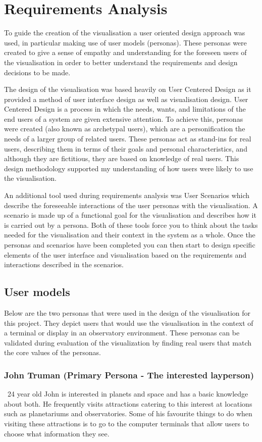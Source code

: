 \chapter{Requirements Analysis}\label{C:ra}
To guide the creation of the visualisation a user oriented design approach was
used, in particular making use of user models (personas). These personas were
created to give a sense of empathy and understanding for the foreseen users of
the visualisation in order to better understand the requirements and design
decisions to be made. 

The design of the visualisation was based heavily on User Centered Design as it
provided a method of user interface design as well as visualisation design. User
Centered Design is a process in which the needs, wants, and limitations of the
end users of a system are given extensive attention. To achieve this, personas
were created (also known as archetypal users), which are a personification the
needs of a larger group of related users. These personas act as stand-ins for
real users, describing them in terms of their goals and personal
characteristics, and although they are fictitious, they are based on knowledge
of real users. This design methodology supported my understanding of how users
were likely to use the visualisation.

An additional tool used during requirements analysis was User Scenarios which
describe the foreseeable interactions of the user personas with the
visualisation. A scenario is made up of a functional goal for the visualisation
and describes how it is carried out by a persona. Both of these tools force you
to think about the tasks needed for the visualisation and their context in the
system as a whole. Once the personas and scenarios have been completed you can
then start to design specific elements of the user interface and visualisation
based on the requirements and interactions described in the scenarios.
\section{User models}
Below are the two personas that were used in the design of the visualisation for
this project. They depict users that would use the visualisation in the context
of a terminal or display in an observatory environment. These personas  can be
validated during evaluation of the visualization by finding real users that
match the core values of the personas.

\subsection{John Truman (Primary Persona - The interested layperson)}\
24 year old John is interested in planets and space and has a basic knowledge
about both. He frequently visits attractions catering to this interest at
locations such as planetariums and observatories. Some of his favourite things
to do when visiting these attractions is to go to the computer terminals that
allow users to choose what information they see.

